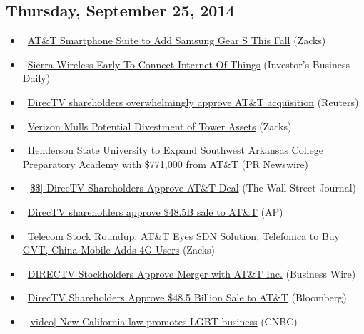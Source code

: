 \documentclass[11pt,asymmetric]{article}
\begin{document}
\subsection*{Thursday, September 25, 2014}
\begin{itemize}
\item\ \href{http://finance.yahoo.com/news/t-smartphone-suite-add-samsung-201219564.html}{AT\&T Smartphone Suite to Add Samsung Gear S This Fall} (Zacks)
\item\ \href{http://news.investors.com/092514-718996-sierra-wireless-connects-internet-of-things.htm?ven=yahoocp&src=aurlled&ven=yahoo}{Sierra Wireless Early To Connect Internet Of Things} (Investor's Business Daily)
\item\ \href{http://finance.yahoo.com/news/directv-shareholders-overwhelmingly-approve-t-193338958.html}{DirecTV shareholders overwhelmingly approve AT\&T acquisition} (Reuters)
\item\ \href{http://finance.yahoo.com/news/verizon-mulls-potential-divestment-tower-175003135.html}{Verizon Mulls Potential Divestment of Tower Assets} (Zacks)
\item\ \href{http://finance.yahoo.com/news/henderson-state-university-expand-southwest-173000989.html}{Henderson State University to Expand Southwest Arkansas College Preparatory Academy with \$771,000 from AT\&T} (PR Newswire)
\item\ \href{http://online.wsj.com/articles/directv-shareholders-approve-at-t-deal-1411659239?mod=yahoo_hs}{[\$\$] DirecTV Shareholders Approve AT\&T Deal} (The Wall Street Journal)
\item\ \href{http://finance.yahoo.com/news/directv-shareholders-approve-48-5b-155945002.html}{DirecTV shareholders approve \$48.5B sale to AT\&T} (AP)
\item\ \href{http://finance.yahoo.com/news/telecom-stock-roundup-t-eyes-144502414.html}{Telecom Stock Roundup: AT\&T Eyes SDN Solution, Telefonica to Buy GVT, China Mobile Adds 4G Users} (Zacks)
\item\ \href{http://finance.yahoo.com/news/directv-stockholders-approve-merger-t-144400725.html}{DIRECTV Stockholders Approve Merger with AT\&T Inc.} (Business Wire)
\item\ \href{http://www.bloomberg.com/news/2014-09-25/directv-shareholders-approve-48-5-billion-sale-to-at-t.html?cmpid=yhoo}{DirecTV Shareholders Approve \$48.5 Billion Sale to AT\&T} (Bloomberg)
\item\ \href{http://video.cnbc.com/gallery/?video=3000313551&__source=yahoo%7cheadline%7cquote%7cvideo%7c&par=yahoo}{[video] New California law promotes LGBT business} (CNBC)

\end{itemize}
\end{document}
